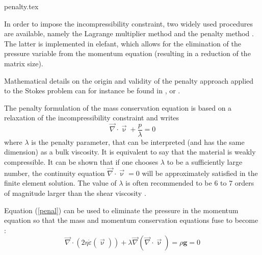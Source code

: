 \begin{flushright} {\tiny {\color{gray} penalty.tex}} \end{flushright}

\label{sec_penalty}


In order to impose the incompressibility constraint, two widely used procedures are available, namely the 
Lagrange multiplier method and the penalty method \cite{bathe82,hugh}. The latter is implemented in {\sc elefant}, which allows for the elimination of the pressure variable from the momentum equation (resulting in a reduction of the matrix size).%

Mathematical details on the origin and validity of the penalty approach applied to the Stokes problem can for instance be found in  \cite{cuss86}, \cite{redd82} or \cite{gunz89}.

The penalty formulation of the mass conservation equation is based on a relaxation of the incompressibility constraint and writes 
\begin{equation}
{\vec \nabla}\cdot {\vec \upnu} + \frac{p}{\lambda} = 0 \label{penal}
\end{equation}
where $\lambda$ is the penalty parameter, that can be interpreted (and has the same dimension) as a bulk viscosity. It is 
equivalent to say that the material is weakly compressible. It can be shown that if one chooses $\lambda$ to be a 
sufficiently large number, the continuity equation $ {\vec \nabla}\cdot {\vec \upnu} = 0$ will be approximately satisfied in the finite element solution. The value of $\lambda$ is often recommended to be 6 to 7 orders of magnitude larger than the shear viscosity \cite{dohu03,hulb79}.


Equation (\ref{penal}) can be used to eliminate the pressure in the momentum equation 
so that the mass and momentum conservation equations fuse to become :
\begin{equation}
{\vec \nabla}\cdot ( 2 \eta \dot\varepsilon({\vec \upnu})) 
+ \lambda {\vec \nabla} ({\vec \nabla }\cdot {\vec \upnu}) = \rho {\bm g} = 0 \label{peneq}
\end{equation}

